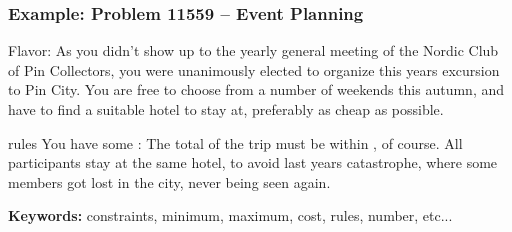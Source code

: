 \documentclass{beamer}
\begin{document}
\begin{frame}
  \frametitle{Example: Problem 11559 -- Event Planning}

  {\smaller
  \begin{alertblock}{Flavor:}
    As you didn't show up to the yearly general meeting of the Nordic
    Club of Pin Collectors, you were unanimously elected to organize
    this years excursion to Pin City.  You are free to choose from a
    number of weekends this autumn, and have to find a suitable hotel
    to stay at, preferably as cheap as possible.
  \end{alertblock}

  \begin{exampleblock}{rules}
    You have some : The total
     of the trip must be within
    , of course. All participants
     stay at the same hotel, to avoid last years
    catastrophe, where some members got lost in the city, never being seen
    again.
  \end{exampleblock}}

  \bigskip

  {\bf Keywords:} constraints, minimum, maximum, cost, rules, number,
  etc...
\end{frame}
\end{document}
